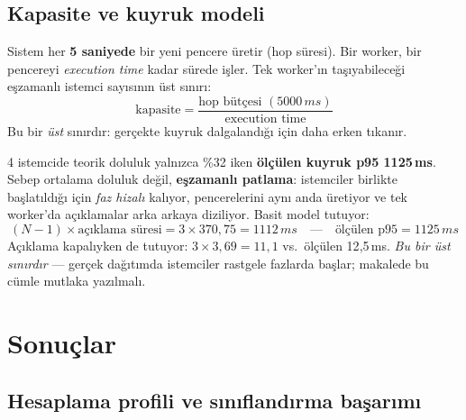 \documentclass[11pt,a4paper]{article}
\newcommand{\ms}{\,ms}
\begin{document}
\subsection{Kapasite ve kuyruk modeli}

\begin{tanim}
Sistem her \textbf{5 saniyede} bir yeni pencere üretir (hop süresi). Bir
worker, bir pencereyi \emph{execution time} kadar sürede işler. Tek worker'ın
taşıyabileceği eşzamanlı istemci sayısının üst sınırı:
\[
\text{kapasite} = \frac{\text{hop bütçesi } (5000\ms)}{\text{execution time}}
\]
Bu bir \emph{üst} sınırdır: gerçekte kuyruk dalgalandığı için daha erken
tıkanır.
\end{tanim}

\begin{bulgu}
4 istemcide teorik doluluk yalnızca \%32 iken \textbf{ölçülen kuyruk p95
1125\ms}. Sebep ortalama doluluk değil, \textbf{eşzamanlı patlama}:
istemciler birlikte başlatıldığı için \emph{faz hizalı} kalıyor, pencerelerini
aynı anda üretiyor ve tek worker'da açıklamalar arka arkaya diziliyor. Basit
model tutuyor:
\[
(N-1)\times\text{açıklama süresi} = 3 \times 370{,}75 = 1112\ms
\quad\text{---}\quad \text{ölçülen p95} = 1125\ms
\]
Açıklama kapalıyken de tutuyor: $3\times3{,}69 = 11{,}1$ vs.\ ölçülen
12{,}5\ms. \emph{Bu bir üst sınırdır} --- gerçek dağıtımda istemciler rastgele
fazlarda başlar; makalede bu cümle mutlaka yazılmalı.
\end{bulgu}

\section{Sonuçlar}

\subsection{Hesaplama profili ve sınıflandırma başarımı}
\end{document}
